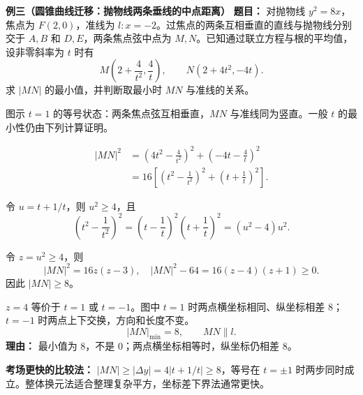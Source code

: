 \clearpage
\begin{examplebox}
    \textbf{\textcolor{CExample}{例三（圆锥曲线迁移：抛物线两条垂线的中点距离）}}
    \textbf{\textcolor{CExample}{题目：}}
    对抛物线 $y^2=8x$，焦点为 $F(2,0)$，准线为 $l:x=-2$。过焦点的两条互相垂直的直线与抛物线分别交于 $A,B$ 和 $D,E$，两条焦点弦中点为 $M,N$。已知通过联立方程与根的平均值，设非零斜率为 $t$ 时有
    \[
      M\left(2+\frac4{t^2},\frac4t\right),\qquad
      N(2+4t^2,-4t).
    \]
    求 $|MN|$ 的最小值，并判断取最小时 $MN$ 与准线的关系。
    
    图示 $t=1$ 的等号状态：两条焦点弦互相垂直，$MN$ 与准线同为竖直。一般 $t$ 的最小性仍由下列计算证明。
    \begin{description}[style=nextline, leftmargin=2.8em, labelsep=0.5em, itemsep=0.55em]
        \item[\textbf{第一步（先化为坐标差）：}]
            \[
              \begin{aligned}
              |MN|^2&=\left(4t^2-\frac4{t^2}\right)^2
                         +\left(-4t-\frac4t\right)^2\\
                 &=16\left[\left(t^2-\frac1{t^2}\right)^2
                    +\left(t+\frac1t\right)^2\right].
              \end{aligned}
            \]
        \item[\textbf{第二步（发现倒数和整体）：}]
            令 $u=t+1/t$，则 $u^2\ge4$，且
            \[
              \left(t^2-\frac1{t^2}\right)^2
              =\left(t-\frac1t\right)^2\left(t+\frac1t\right)^2
              =(u^2-4)u^2.
            \]
        \item[\textbf{第三步（用二次式证明最小）：}]
            令 $z=u^2\ge4$，则
            \[
              |MN|^2=16z(z-3),\quad
              |MN|^2-64=16(z-4)(z+1)\ge0.
            \]
            因此 $|MN|\ge8$。
        \item[\textbf{第四步（验等号并检查方向）：}]
            $z=4$ 等价于 $t=1$ 或 $t=-1$。图中 $t=1$ 时两点横坐标相同、纵坐标相差 $8$；$t=-1$ 时两点上下交换，方向和长度不变。
            \[
              \boxed{|MN|_{\min}=8,\qquad MN\parallel l.}
            \]
            \textbf{理由：} 最小值为 $8$，不是 $0$；两点横坐标相等时，纵坐标仍相差 $8$。
    \end{description}
    \textbf{考场更快的比较法：} $|MN|\ge|\Delta y|=4|t+1/t|\ge8$，等号在 $t=\pm1$ 时两步同时成立。整体换元法适合整理复杂平方，坐标差下界法通常更快。

    \end{examplebox}
